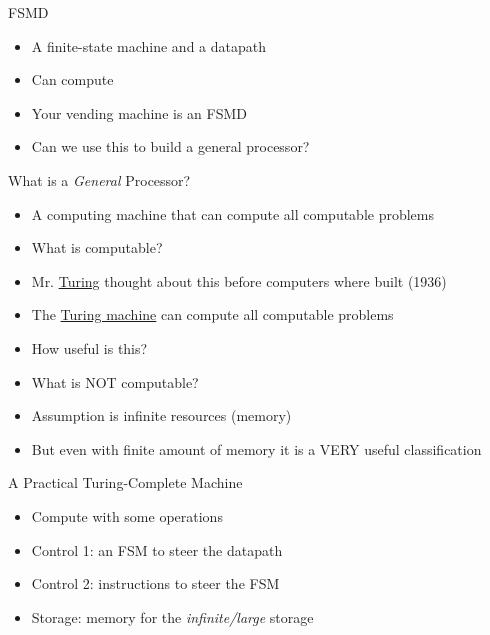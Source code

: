 
\begin{frame}[fragile]{FSMD}
\begin{itemize}
\item A finite-state machine and a datapath
\item Can compute
\item Your vending machine is an FSMD
\item Can we use this to build a general processor?
\end{itemize}
\end{frame}

\begin{frame}[fragile]{What is a \emph{General} Processor?}
\begin{itemize}
\item A computing machine that can compute all computable problems
\item What is computable?
\item Mr. \href{https://en.wikipedia.org/wiki/Alan_Turing}{Turing} thought about this before computers where built (1936)
\item The \href{https://en.wikipedia.org/wiki/Turing_machine}{Turing machine} can compute all computable problems
\item How useful is this?
\item What is NOT computable?
\item Assumption is infinite resources (memory)
\item But even with finite amount of memory it is a VERY useful classification
\end{itemize}
\end{frame}

\begin{frame}[fragile]{A Practical Turing-Complete Machine}
\begin{itemize}
\item Compute with some operations
\item Control 1: an FSM to steer the datapath
\item Control 2: instructions to steer the FSM
\item Storage: memory for the \emph{infinite/large} storage
\end{itemize}
\end{frame}

